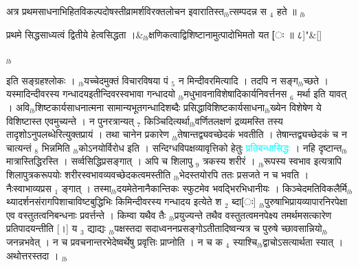 \documentclass[article,12pt,a4paper]{memoir}%
\newcommand{\quotelemma}[1]{\textcolor{cyan}{#1}}
\newcounter{parCount}
\begin{document}
	  
	  \pstart \leavevmode%
	अत्र प्रथमसाधनाभिहितविकल्पदोषस्तीव्रामर्शविरक्तलोचन इवारातिस्त{\tiny $_{lb}$}त्सम्पदन्न स {\tiny $_{4}$} हते ॥
	{}
	\pend%
      {\tiny $_{lb}$}
	  \bigskip
	  \begingroup
	
	    
	    \stanza[\smallbreak]
	  प्रथमे सिद्धसाध्यत्वं द्वितीये हेत्वसिद्धता ।&{\tiny $_{lb}$}क्षणिकत्वाद्विशिष्टानामुत्पादोभिमतो यत [ः ॥ ८]{\normalfontlatin\large\qquad{}"}\&[\smallbreak]
	  
	  
	  
	  \endgroup
	{\tiny $_{lb}$}

	  
	  \pstart \leavevmode%
	इति सङ्ग्रहश्लोकः । {\tiny $_{lb}$}यच्चेदमुक्तं विचारविषया पं {\tiny $_{5}$} न मिन्दीवरमित्यादि । तदपि न सङ्ग{\tiny $_{lb}$}च्छते । यस्मादिन्दीवरस्य गन्धादयइतीन्दिवरस्वभावा गन्धादयो {\tiny $_{lb}$}मधुभावनाविशेषादिकार्यनिवर्त्तनस {\tiny $_{6}$} मर्था इति यावत् । अवि{\tiny $_{lb}$}शिष्टकार्यसाधनात्मना सामान्यभूतगन्धादिशब्दैः प्रसिद्धाविशिष्टकार्यसाधना{\tiny $_{lb}$}ख्येन विशेषेण ये विशिष्टास्त एवमुच्यन्ते । न पुनरत्रान्यत् {\tiny $_{7}$} किञ्चिदित्यर्था{\tiny $_{lb}$}वर्णितलक्षणं द्रव्यमस्ति तस्य तादृशोऽनुपलब्धेरित्युक्तप्रायं । तथा चानेन प्रकारेण {\tiny $_{lb}$}तेषान्तद्व्यवच्छेदकं भवतीति । तेषान्तद्व्यच्छेदकं च न चात्यन्तं {\tiny $_{8}$} भिन्नमिति {\tiny $_{lb}$}कोऽनयोर्विरोध इति । सन्दिग्धविपक्षव्यावृत्तिको हेतुः \quotelemma{प्रतिबन्धासिद्धः} । नहि दृष्टान्त{\tiny $_{lb}$}मात्रास्तिद्धिरस्ति । सर्व्वसिद्धिप्रसङ्गात् । अपि च शिलापु {\tiny $_{9}$} \leavevmode{} त्रकस्य शरीरं । {\tiny $_{lb}$}रूपस्य स्वभाव इत्यत्रापि शिलापुत्रकरूपयोः शरीरस्वभावव्यवच्छेदकत्वमस्तीति {\tiny $_{lb}$}भेदस्तयोरपि ततः प्रसजते न च भवति । नैःस्वाभाव्यप्रस {\tiny $_{1}$} ङ्गात् । तस्मा{\tiny $_{lb}$}दयमेतेनानैकान्तिकः स्फुटमेव भवद्भिरभिधानीयः । किञ्चेदमतिविकलैर्मि{\tiny $_{lb}$}थ्यादर्शनसंरागपिशाचाविष्टबुद्धिभिः किमिन्दीवरस्य गन्धादय इत्येते श {\tiny $_{2}$} ब्दा[ः] {\tiny $_{lb}$}पुरुषाभिप्रायव्यापारनिरपेक्षा एव वस्तुतत्वनिबन्धनाः प्रवर्त्तन्ते । किम्वा यथैव तैः {\tiny $_{lb}$}प्रयुज्यन्ते तथैव वस्तुतत्वमनपेक्ष्य तमर्थमसत्कारेण प्रतिपादयन्तीति [।] य {\tiny $_{3}$} द्याद्यः {\tiny $_{lb}$}पक्षस्तदा सदाध्वननप्रसङ्गोऽतीतादिष्वन्यत्र च पुरुषे च्छावसान्नियो{\tiny $_{lb}$}जनन्नभवेत् । न च प्रवचनान्तरभेदेष्वर्थेषु प्रवृत्तिः प्राप्नोति । न च क {\tiny $_{4}$} स्याश्चि{\tiny $_{lb}$}द्वाचोऽसत्यार्थता स्यात् । अथोत्तरस्तदा । {\tiny $_{lb}$} 
	    \pend%
	  
\end{document}
